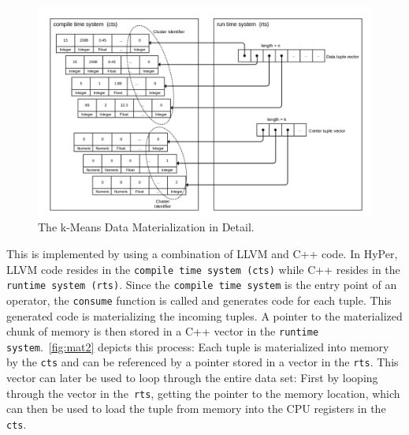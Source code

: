 \FloatBarrier

\begin{figure}[htsb]
  \centerline{
  \includegraphics[scale=0.215]{figures/mat3_font2}}
  \caption[The k-Means Data Materialization in Detail]{The k-Means Data Materialization in Detail.}
  \label{fig:mat3}
\end{figure}






This is implemented by using a combination of LLVM and C++ code. In HyPer, LLVM code resides in the \texttt{compile time system (cts)} while C++ resides in the \texttt{runtime system (rts)}. Since the \texttt{compile time system} is the entry point of an operator, the \texttt{consume} function is called and generates code for each tuple. This generated code is materializing the incoming tuples. A pointer to the materialized chunk of memory is then stored in a C++ vector in the \texttt{runtime system}.~\autoref{fig:mat2} depicts this process: Each tuple is materialized into memory by the \texttt{cts} and can be referenced by a pointer stored in a vector in the \texttt{rts}. This vector can later be used to loop through the entire data set: First by looping through the vector in the~\texttt{rts}, getting the pointer to the memory location, which can then be used to load the tuple from memory into the CPU registers in the \texttt{cts}. 


